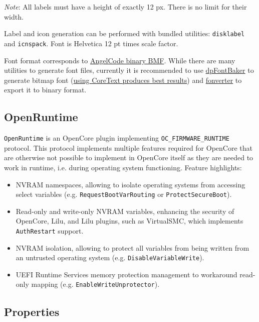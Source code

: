\documentclass[]{article}
\begin{document}
\emph{Note}: All labels must have a height of exactly 12 px. There is no limit for their width.

Label and icon generation can be performed with bundled utilities: \texttt{disklabel} and
\texttt{icnspack}. Font is Helvetica 12 pt times scale factor.

Font format corresponds to \href{https://www.angelcode.com/products/bmfont}{AngelCode binary BMF}.
While there are many utilities to generate font files, currently it is recommended to use
\href{https://github.com/danpla/dpfontbaker}{dpFontBaker} to generate bitmap font
(\href{https://github.com/danpla/dpfontbaker/pull/1}{using CoreText produces best results})
and \href{https://github.com/usr-sse2/fonverter}{fonverter} to export it to binary format.

\subsection{OpenRuntime}\label{uefiruntime}

\texttt{OpenRuntime} is an OpenCore plugin implementing \texttt{OC\_FIRMWARE\_RUNTIME} protocol.
This protocol implements multiple features required for OpenCore that are otherwise not possible
to implement in OpenCore itself as they are needed to work in runtime, i.e. during operating system
functioning. Feature highlights:

\begin{itemize}
  \item NVRAM namespaces, allowing to isolate operating systems from accessing select
  variables (e.g. \texttt{RequestBootVarRouting} or \texttt{ProtectSecureBoot}).
  \item Read-only and write-only NVRAM variables, enhancing the security of OpenCore,
  Lilu, and Lilu plugins, such as VirtualSMC, which implements \texttt{AuthRestart} support.
  \item NVRAM isolation, allowing to protect all variables from being written from
  an untrusted operating system (e.g. \texttt{DisableVariableWrite}).
  \item UEFI Runtime Services memory protection management to workaround read-only
  mapping (e.g. \texttt{EnableWriteUnprotector}).
\end{itemize}

\subsection{Properties}\label{uefiprops}
\end{document}
